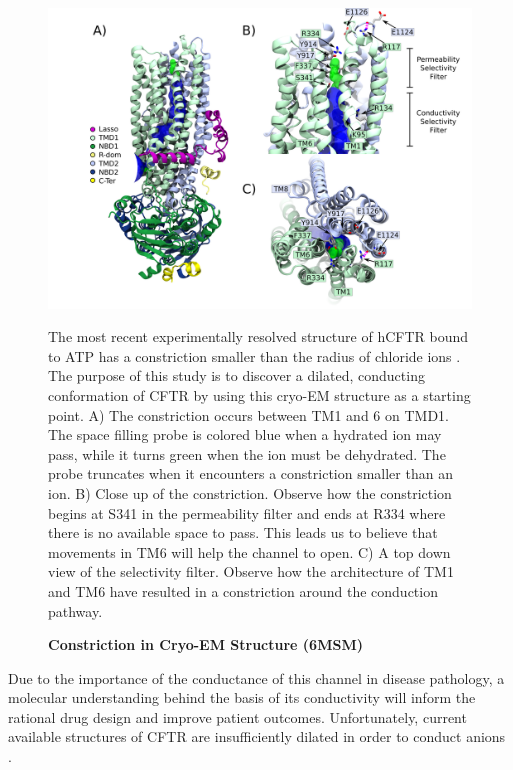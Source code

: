 \begin{figure}
	\begin{center}
		\includegraphics[width=1\textwidth]{figures/opening/overall_hole_constricted.pdf}
	\end{center}
	\captionsetup{singlelinecheck = false, justification=raggedright}
	\caption[Constriction in Cryo-EM Structure (6MSM)] {\textbf{Constriction in Cryo-EM Structure (6MSM)}}{The most recent experimentally resolved structure of hCFTR bound to ATP has a constriction smaller than the radius of chloride ions \cite{zhang2018}. The purpose of this study is to discover a dilated, conducting conformation of CFTR by using this cryo-EM structure as a starting point. A) The constriction occurs between TM1 and 6 on TMD1. The space filling probe is colored blue when a hydrated ion may pass, while it turns green when the ion must be dehydrated. The probe truncates when it encounters a constriction smaller than an ion.  B) Close up of the constriction. Observe how the constriction begins at S341 in the permeability filter and ends at R334 where there is no available space to pass. This leads us to believe that movements in TM6 will help the channel to open. C) A top down view of the selectivity filter. Observe how the architecture of TM1 and TM6 have resulted in a constriction around the conduction pathway.}
	\label{constricted_sel_filter}
\end{figure}

Due to the importance of the conductance of this channel in disease pathology, a molecular understanding behind the basis of its conductivity will inform the rational drug design and improve patient outcomes. Unfortunately, current available structures of CFTR are insufficiently dilated in order to conduct anions \cite{zhang2018}.

